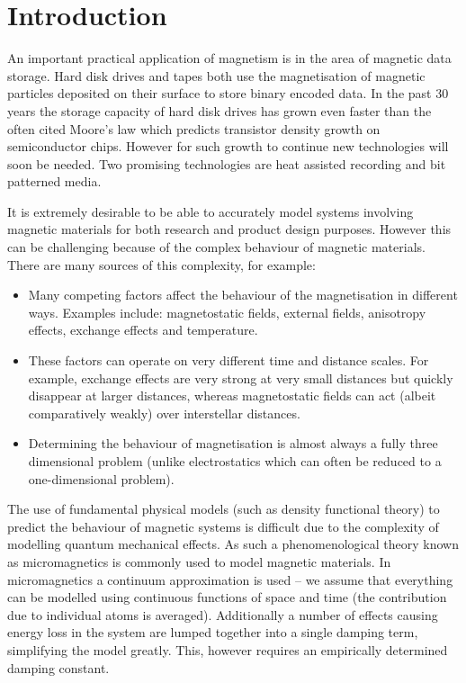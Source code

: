 
\chapter{Introduction}
\label{sec:introduction}

An important practical application of magnetism is in the area of magnetic data storage. Hard disk drives and tapes both use the magnetisation of magnetic particles deposited on their surface to store binary encoded data. In the past 30 years the storage capacity of hard disk drives has grown even faster than the often cited Moore's law which predicts transistor density growth on semiconductor chips. \cite{McDaniel2005} However for such growth to continue new technologies will soon be needed. %
Two promising technologies are heat assisted recording and bit patterned media.

It is extremely desirable to be able to accurately model systems involving magnetic materials for both research and product design purposes. However this can be challenging because of the complex behaviour of magnetic materials. There are many sources of this complexity, for example:
\begin{itemize}
\item Many competing factors affect the behaviour of the magnetisation in different ways. Examples include: magnetostatic fields, external fields, anisotropy effects, exchange effects and temperature.

\item These factors can operate on very different time and distance scales. For example, exchange effects are very strong at very small distances but quickly disappear at larger distances, whereas magnetostatic fields can act (albeit comparatively weakly) over interstellar distances.

\item Determining the behaviour of magnetisation is almost always a fully three dimensional problem (unlike electrostatics which can often be reduced to a one-dimensional problem).
\end{itemize}

The use of fundamental physical models (such as density functional theory) to predict the behaviour of magnetic systems is difficult due to the complexity of modelling quantum mechanical effects. As such a phenomenological theory known as micromagnetics is commonly used to model magnetic materials.\cite{Coey2010} \cite{Kronmuller2003} In micromagnetics a continuum approximation is used -- we assume that everything can be modelled using continuous functions of space and time (the contribution due to individual atoms is averaged). Additionally a number of effects causing energy loss in the system are lumped together into a single damping term, simplifying the model greatly. This, however requires an empirically determined damping constant.

